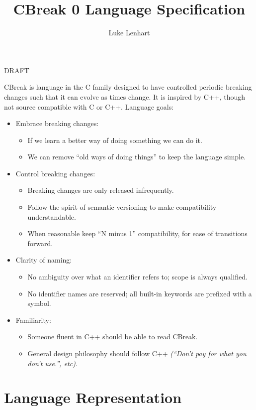 \documentclass{article}
\title{CBreak 0 Language Specification}
\date{}
\author{Luke Lenhart}
\begin{document}
\maketitle
DRAFT

CBreak is language in the C family designed to have controlled periodic breaking changes such that it can evolve as times change.  It is inspired by C++, though not source compatible with C or C++.
\medbreak
Language goals:
\begin{itemize}
 \item Embrace breaking changes:
  \begin{itemize}
    \item If we learn a better way of doing something we can do it.
    \item We can remove ``old ways of doing things'' to keep the language simple.
  \end{itemize}
  \item Control breaking changes:
  \begin{itemize}
    \item Breaking changes are only released infrequently.
    \item Follow the spirit of semantic versioning to make compatibility understandable.
    \item When reasonable keep ``N minus 1'' compatibility, for ease of transitions forward.
  \end{itemize}
  \item Clarity of naming:
  \begin{itemize}
    \item No ambiguity over what an identifier refers to; scope is always qualified.
    \item No identifier names are reserved; all built-in keywords are prefixed with a symbol.
  \end{itemize}
  \item Familiarity:
  \begin{itemize}
    \item Someone fluent in C++ should be able to read CBreak.
    \item General design philosophy should follow C++ \textit{(``Don't pay for what you don't use.'', etc)}.
  \end{itemize}
\end{itemize}
\newpage


\tableofcontents
\newpage


\section{Language Representation}
\end{document}
